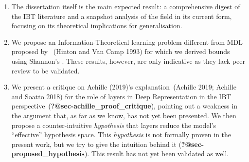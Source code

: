 \documentclass[
  letterpaper,
  12pt,
  british]{tufte-book}
\theoremstyle{plain}
\theoremstyle{plain}
\theoremstyle{definition}
\theoremstyle{remark}
\begin{document}
\begin{enumerate}
\def\labelenumi{\arabic{enumi}.}
\item
  The dissertation itself is the main expected result: a comprehensive
  digest of the {IBT} literature and a snapshot analysis of the field in
  its current form, focusing on its theoretical implications for
  generalisation.
\item
  We propose an Information-Theoretical learning problem different from
  {MDL} proposed by ~(Hinton and Van Camp
  1993)
  for which we derived bounds using Shannon's . These results, however,
  are only indicative as they lack peer review to be validated.
\item
  We present a critique on Achille
  (2019)'s
  explanation~(Achille 2019; Achille and Soatto
  2018)
  for the role of layers in Deep Representation in the {IBT}
  perspective~(\textbf{?@sec-achille\_proof\_critique}), pointing out a
  weakness in the argument that, as far as we know, has not yet been
  presented. We then propose a counter-intuitive \emph{hypothesis} that
  layers reduce the model's ``effective'' hypothesis space. This
  \emph{hypothesis} is not formally proven in the present work, but we
  try to give the intuition behind it
  (\textbf{?@sec-proposed\_hypothesis}). This result has not yet been
  validated as well.
\end{enumerate}
\end{document}
